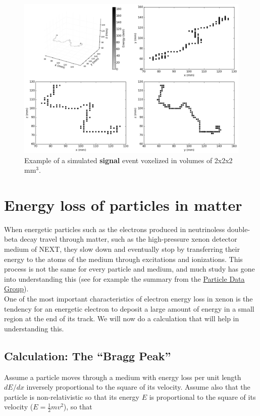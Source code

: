 \documentclass[10pt]{article}
\begin{document}
\begin{figure}[!ht]
	\centering
	\includegraphics[scale=0.4]{fig/plt_dnn3d_NEXT100_Paolina222_v2x2x2_r200x200x200_si_2.png}
	\caption{\label{fig_siexample}Example of a simulated \textbf{signal} event voxelized in volumes of 2x2x2 mm$^3$.}
\end{figure}

\section{Energy loss of particles in matter}
\noindent When energetic particles such as the electrons produced in neutrinoless double-beta decay travel through matter, such as the high-pressure xenon detector medium of NEXT, they
slow down and eventually stop by transferring their energy to the atoms of the medium through excitations and ionizations.  This process is not the same for every particle and medium, and much
study has gone into understanding this (see for example the summary from the \href{http://pdg.lbl.gov/2014/reviews/rpp2014-rev-passage-particles-matter.pdf}{Particle Data Group}).\\

\noindent One of the most important characteristics of electron energy loss in xenon is the tendency for an energetic electron to deposit a large amount of energy in a small region at the end
of its track.  We will now do a calculation that will help in understanding this.\\

\subsection{Calculation: The ``Bragg Peak''}
\noindent Assume a particle moves through a medium with energy loss per unit length $dE/dx$ inversely proportional to the square of its velocity.  Assume also that the particle is 
non-relativistic so that its energy $E$ is proportional to the square of its velocity ($E = \frac{1}{2}mv^{2}$), so that
\end{document}
